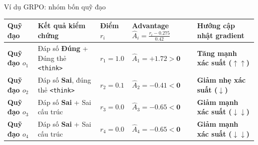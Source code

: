 \begin{frame}{Ví dụ GRPO: nhóm bốn quỹ đạo}
  \vspace{0.05cm}
  \scriptsize
  \renewcommand{\arraystretch}{1.15}
  \setlength{\tabcolsep}{3pt}
  \begin{tabularx}{\textwidth}{@{}>{\raggedright\arraybackslash}p{.13\linewidth} >{\raggedright\arraybackslash}X >{\centering\arraybackslash}p{.12\linewidth} >{\centering\arraybackslash}p{.23\linewidth} >{\raggedright\arraybackslash}X@{}}
    \toprule
    \textbf{Quỹ đạo} & \textbf{Kết quả kiểm chứng} & \textbf{Điểm $r_i$} & \textbf{Advantage}\newline $\hat{A}_i = \frac{r_i - 0.275}{0.42}$ & \textbf{Hướng cập nhật gradient} \\
    \midrule
    \textbf{Quỹ đạo $o_1$} & Đáp số \textbf{Đúng} + Đúng thẻ \texttt{<think>} & $r_1 = \mathbf{1.0}$ & $\hat{A}_1 = \mathbf{+1.72 > 0}$ & \textbf{\textcolor{tealgreen}{Tăng mạnh xác suất ($\uparrow\uparrow$)}} \\

    \textbf{Quỹ đạo $o_2$} & Đáp số \textbf{Sai}, đúng thẻ \texttt{<think>} & $r_2 = \mathbf{0.1}$ & $\hat{A}_2 = \mathbf{-0.41 < 0}$ & \textbf{\textcolor{stanfordred}{Giảm nhẹ xác suất ($\downarrow$)}} \\

    \textbf{Quỹ đạo $o_3$} & Đáp số \textbf{Sai} + Sai cấu trúc & $r_3 = \mathbf{0.0}$ & $\hat{A}_3 = \mathbf{-0.65 < 0}$ & \textbf{\textcolor{stanfordred}{Giảm mạnh xác suất ($\downarrow\downarrow$)}} \\

    \textbf{Quỹ đạo $o_4$} & Đáp số \textbf{Sai} + Sai cấu trúc & $r_4 = \mathbf{0.0}$ & $\hat{A}_4 = \mathbf{-0.65 < 0}$ & \textbf{\textcolor{stanfordred}{Giảm mạnh xác suất ($\downarrow\downarrow$)}} \\
    \bottomrule
  \end{tabularx}

  \vspace{0.10cm}
  \par\vspace{0pt}
\end{frame}

